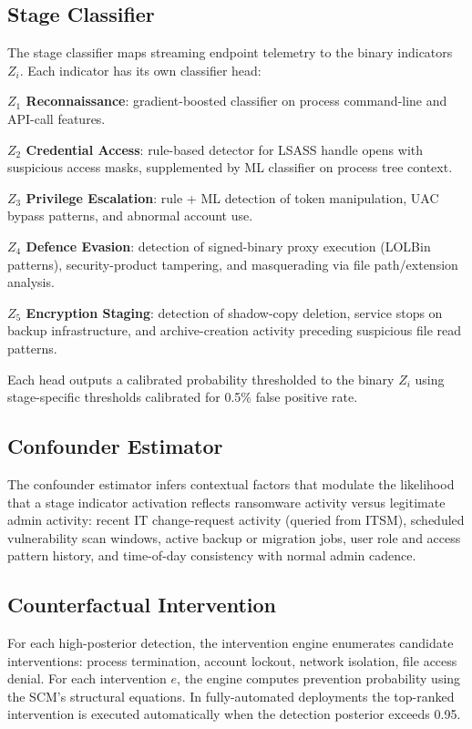 \documentclass[sigconf,nonacm]{acmart}
\begin{document}
\subsection{Stage Classifier}

The stage classifier maps streaming endpoint telemetry to the binary
indicators $Z_i$. Each indicator has its own classifier head:

\textbf{$Z_1$ Reconnaissance}: gradient-boosted classifier on process
command-line and API-call features.

\textbf{$Z_2$ Credential Access}: rule-based detector for LSASS handle
opens with suspicious access masks, supplemented by ML classifier on
process tree context.

\textbf{$Z_3$ Privilege Escalation}: rule + ML detection of token
manipulation, UAC bypass patterns, and abnormal account use.

\textbf{$Z_4$ Defence Evasion}: detection of signed-binary proxy
execution (LOLBin patterns), security-product tampering, and
masquerading via file path/extension analysis.

\textbf{$Z_5$ Encryption Staging}: detection of shadow-copy deletion,
service stops on backup infrastructure, and archive-creation activity
preceding suspicious file read patterns.

Each head outputs a calibrated probability thresholded to the binary
$Z_i$ using stage-specific thresholds calibrated for 0.5\% false
positive rate.

\subsection{Confounder Estimator}

The confounder estimator infers contextual factors that modulate the
likelihood that a stage indicator activation reflects ransomware
activity versus legitimate admin activity: recent IT change-request
activity (queried from ITSM), scheduled vulnerability scan windows,
active backup or migration jobs, user role and access pattern history,
and time-of-day consistency with normal admin cadence.

\subsection{Counterfactual Intervention}

For each high-posterior detection, the intervention engine enumerates
candidate interventions: process termination, account lockout, network
isolation, file access denial. For each intervention $e$, the engine
computes prevention probability using the SCM's structural equations.
In fully-automated deployments the top-ranked intervention is
executed automatically when the detection posterior exceeds 0.95.
\end{document}
